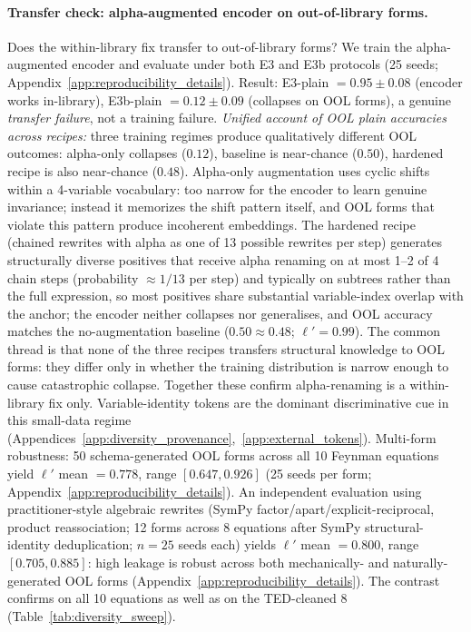\paragraph{Transfer check: alpha-augmented encoder on out-of-library forms.} Does the within-library fix transfer to out-of-library forms? We train the alpha-augmented encoder and evaluate under both E3 and E3b protocols (25 seeds; Appendix~\ref{app:reproducibility_details}). Result: E3-plain $= 0.95 \pm 0.08$ (encoder works in-library), E3b-plain $= 0.12 \pm 0.09$ (collapses on OOL forms), a genuine \emph{transfer failure}, not a training failure.  \emph{Unified account of OOL plain accuracies across recipes:} three training regimes produce qualitatively different OOL outcomes: alpha-only collapses ($0.12$), baseline is near-chance ($0.50$), hardened recipe is also near-chance ($0.48$).  Alpha-only augmentation uses cyclic shifts within a 4-variable vocabulary: too narrow for the encoder to learn genuine invariance; instead it memorizes the shift pattern itself, and OOL forms that violate this pattern produce incoherent embeddings.  The hardened recipe (chained rewrites with alpha as one of 13 possible rewrites per step) generates structurally diverse positives that receive alpha renaming on at most 1--2 of 4 chain steps (probability ${\approx}1/13$ per step) and typically on subtrees rather than the full expression, so most positives share substantial variable-index overlap with the anchor; the encoder neither collapses nor generalises, and OOL accuracy matches the no-augmentation baseline ($0.50 \approx 0.48$; $\ell'{=}0.99$).  The common thread is that none of the three recipes transfers structural knowledge to OOL forms: they differ only in whether the training distribution is narrow enough to cause catastrophic collapse. Together these confirm alpha-renaming is a within-library fix only. Variable-identity tokens are the dominant discriminative cue in this small-data regime (Appendices~\ref{app:diversity_provenance},~\ref{app:external_tokens}). Multi-form robustness: 50 schema-generated OOL forms across all 10 Feynman equations yield $\ell'$ mean $= 0.778$, range $[0.647, 0.926]$ (25 seeds per form; Appendix~\ref{app:reproducibility_details}).  An independent evaluation using practitioner-style algebraic rewrites (SymPy factor/apart/explicit-reciprocal, product reassociation; 12 forms across 8 equations after SymPy structural-identity deduplication; $n{=}25$ seeds each) yields $\ell'$ mean $= 0.800$, range $[0.705, 0.885]$: high leakage is robust across both mechanically- and naturally-generated OOL forms (Appendix~\ref{app:reproducibility_details}). The contrast confirms on all 10 equations as well as on the TED-cleaned 8 (Table~\ref{tab:diversity_sweep}).

